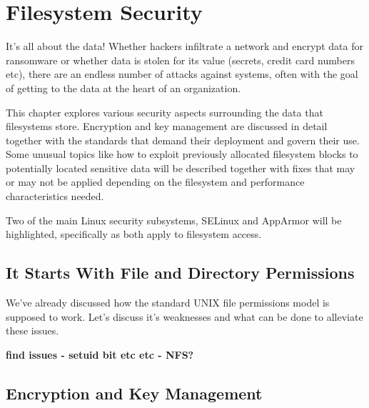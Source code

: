 \chapter{Filesystem Security}

It's all about the data! Whether hackers infiltrate a network and encrypt data for ransomware or whether data is stolen for its value (secrets, credit card numbers etc), there are an endless number of attacks against systems, often with the goal of getting to the data at the heart of an organization.

This chapter explores various security aspects surrounding the data that filesystems store. Encryption and key management are discussed in detail together with the standards that demand their deployment and govern their use. Some unusual topics like how to exploit previously allocated filesystem blocks to potentially located sensitive data will be described together with fixes that may or may not be applied depending on the filesystem and performance characteristics needed.

Two of the main Linux security subsystems, SELinux and AppArmor will be highlighted, specifically as both apply to filesystem access.

%




\section{It Starts With File and Directory Permissions}

We've already discussed how the standard UNIX file permissions model is supposed to work. Let's discuss it's weaknesses and what can be done to alleviate these issues.

\textbf{find issues - setuid bit etc etc - NFS?}

\section{Encryption and Key Management}\label{encryption}

